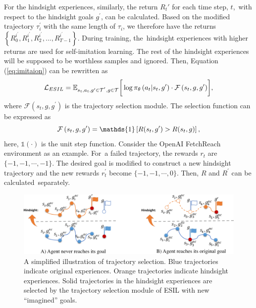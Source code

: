 For the hindsight experiences, similarly, the return $R_{t}'$ for each time step, $t$,~with respect to the hindsight goals $g^\prime$, can be calculated. Based on the modified trajectory $\tau_{i}^{\prime}$ with the same length of $\tau_{i}$, we therefore have the returns $\left\{R_{0}^{i^\prime}, R_{1}^{i^\prime}, R_{2}^{i^\prime}, ..., R_{T-1}^{i^\prime}\right\}$. During training, the~hindsight experiences with higher returns are used for self-imitation learning. The rest of the hindsight experiences will be supposed to be worthless samples and ignored.
Then, Equation (\ref{eq:imitaion}) can be rewritten as
\begin{equation}
  \centering
  \mathcal{L}_{ESIL}=\mathbb{E}_{s_{t}, a_{t}, g^\prime\in\Tau^{'},g\in\Tau}\biggr[\log\pi_{\theta}\left(a_{t}|s_{t}, g^\prime\right)\cdot\mathcal{F}\left(s_{t}, g, g^\prime\right)\biggr],
  \label{eq:final_loss}
\end{equation}
where $\mathcal{F}\left(s_{t}, g, g^{\prime}\right)$ is the trajectory selection module. The selection function can be expressed as
\begin{equation}
  \centering
  \mathcal{F}\left(s_{t}, g, g^\prime \right)=\mathds{1}\left[R(s_{t}, g^\prime) > R(s_{t}, g)\right],
\end{equation}
here, {$\mathds{1}(\cdot)$ is the unit step function}. Consider the OpenAI FetchReach environment as an example. For~a failed trajectory, the rewards $r_{t}$ are $\{-1,-1,\cdots, -1\}$. {The desired goal is modified} to construct a new hindsight trajectory and the new rewards $r_{t}^{\prime}$ become $\{-1,-1,\cdots, 0\}$. Then,  {$R$ and $R^{\prime}$ can be calculated~separately.}
\begin{figure}[t!]
  \centering
  \includegraphics[width=\columnwidth]{figures/chapter3/hgs.png}
  \caption{A simplified illustration of trajectory selection. Blue trajectories indicate original experiences. Orange trajectories indicate hindsight experiences. Solid trajectories in the hindsight experiences are selected by the trajectory selection module of ESIL with new ``imagined'' goals.}
  \label{fig:hs_princple}
\end{figure}

